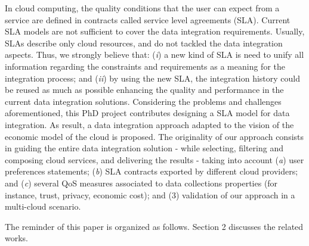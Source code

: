 In cloud computing, the quality conditions that the user can expect from a service are defined in contracts called service level agreements (SLA). 
%
Current SLA models are not sufficient to cover the data integration requirements. 
%
Usually, SLAs describe only cloud resources, and do not tackled the data integration aspects. 
%
Thus, we strongly believe that: 
(\textit{i}) a new kind of SLA is need to unify all information regarding the constraints and requirements as a meaning for the integration process; and 
(\textit{ii}) by using the new SLA, the integration history could be reused as much as possible enhancing the quality and performance in the current data integration solutions. 
%
Considering the problems and challenges aforementioned, this PhD project contributes designing a SLA model for data integration. As result, a data integration approach adapted to the vision of the economic model of the cloud is proposed. The originality of our approach consists in guiding the entire data integration solution - while selecting, filtering and composing cloud services, and delivering the results - taking into account (\textit{a}) user preferences statements; (\textit{b}) SLA contracts exported by different cloud providers; and (\textit{c}) several QoS measures associated to data collections properties (for instance, trust, privacy, economic cost); and (3) validation of our approach in a multi-cloud scenario.

The reminder of this paper is organized as follows.
Section 2 discusses the related works.
